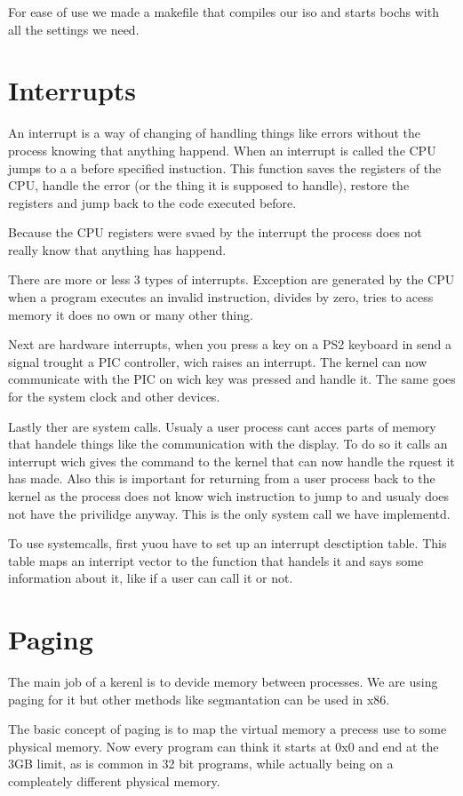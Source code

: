 \documentclass{article}
\begin{document}
For ease of use we made a makefile that compiles our iso and starts bochs with all the settings we need.

\section{Interrupts}
An interrupt is a way of changing of handling things like errors without the process knowing that anything happend. When an interrupt is called the CPU jumps to a a before specified instuction. This function saves the registers of the CPU, handle the error (or the thing it is supposed to handle), restore the registers and jump back to the code executed before.

Because the CPU registers were svaed by the interrupt the process does not really know that anything has happend.

There are more or less 3 types of interrupts. Exception are generated by the CPU when a program executes an invalid instruction, divides by zero, tries to acess memory it does no own or many other thing.

Next are hardware interrupts, when you press a key on a PS2 keyboard in send a signal trought a PIC controller, wich raises an interrupt. The kernel can now communicate with the PIC on wich key was pressed and handle it. The same goes for the system clock and other devices.

Lastly ther are system calls. Usualy a user process cant acces parts of memory that handele things like the communication with the display. To do so it calls an interrupt wich gives the command to the kernel that can now handle the rquest it has made. Also this is important for returning from a user process back to the kernel as the process does not know wich instruction to jump to and usualy does not have the privilidge anyway. This is the only system call we have implementd.

To use systemcalls, first yuou have to set up an interrupt desctiption table. This table maps an interript vector to the function that handels it and says some information about it, like if a user can call it or not.
\section{Paging}

The main job of a kerenl is to devide memory between processes. We are using paging for it but other methods like segmantation can be used in x86.

The basic concept of paging is to map the virtual memory a precess use to some physical memory. Now every program can think it starts at 0x0 and end at the 3GB limit, as is common in 32 bit programs, while actually being on a compleately different physical memory.
\end{document}
